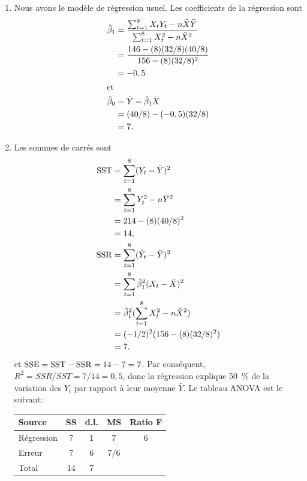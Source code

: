\begin{solution}{2.2}
    \begin{enumerate}
    \item Nous avons le modèle de régression usuel. Les coefficients
      de la régression sont
      \begin{align*}
        \hat{\beta}_1
        &=\frac{\sum_{t=1}^8 X_tY_t-n\bar{X}\bar{Y}}{\sum_{t=1}^8
          X_t^2-n\bar{X}^2} \\
        &=\frac{146-(8)(32/8)(40/8)}{156-(8)(32/8)^2}  \\
        &=-0,5 \\
        \intertext{et}
        \hat{\beta}_0
        &=\bar{Y}-\hat{\beta}_1\bar{X} \\
        &=(40/8)-(-0,5)(32/8) \\
        &=7.
      \end{align*}
    \item Les sommes de carrés sont
      \begin{align*}
        \mathrm{SST}
        &=\sum_{t=1}^8(Y_t-\bar{Y})^2 \\
        &=\sum_{t=1}^8Y_t^2-n\bar{Y}^2 \\
        &=214-(8)(40/8)^2 \\
        &=14, \\
        \mathrm{SSR}
        &=\sum_{t=1}^8(\hat{Y}_t-\bar{Y})^2 \\
        &=\sum_{t=1}^8\hat{\beta}_1^2(X_t-\bar{X})^2 \\
        &=\hat{\beta}_1^2(\sum_{t=1}^8X_t^2-n\bar{X}^2) \\
        &=(-1/2)^2(156-(8)(32/8)^2) \\
        &=7.
      \end{align*}
      et $\mathrm{SSE} = \mathrm{SST} - \mathrm{SSR} = 14 - 7 = 7$. Par conséquent, $R^2 =
      SSR/SST = 7/14 = 0,5$, donc la régression explique 50~\% de la
      variation des $Y_t$ par rapport à leur moyenne $\bar{Y}$. Le
      tableau ANOVA est le suivant:
      \begin{center}
        \begin{tabular}{lcccc}
          \toprule
          Source & SS & d.l. & MS & Ratio F \\
          \midrule
          Régression & 7 & 1 & 7   & 6 \\
          Erreur     & 7 & 6 & 7/6 &  \\
          \midrule
          Total & 14 & 7 & & \\
          \bottomrule
        \end{tabular}
      \end{center}
    \end{enumerate}
  
\end{solution}
